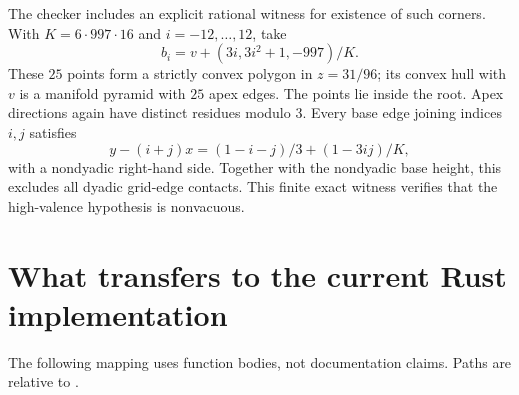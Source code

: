 \documentclass[11pt]{article}
\begin{document}
The checker includes an explicit rational witness for existence of
such corners. With $K=6\cdot997\cdot16$ and $i=-12,\ldots,12$, take
\[
 b_i=v+(3i,3i^2+1,-997)/K.
\]
These $25$ points form a strictly convex polygon in $z=31/96$;
its convex hull with $v$ is a manifold pyramid with $25$ apex edges.
The points lie inside the root. Apex directions again have distinct
residues modulo $3$. Every base edge joining indices $i,j$ satisfies
\[
 y-(i+j)x=(1-i-j)/3+(1-3ij)/K,
\]
with a nondyadic right-hand side. Together with the nondyadic base
height, this excludes all dyadic grid-edge contacts. This finite exact
witness verifies that the high-valence hypothesis is nonvacuous.

\section{What transfers to the current Rust implementation}

The following mapping uses function bodies, not documentation claims.
Paths are relative to .
\end{document}
